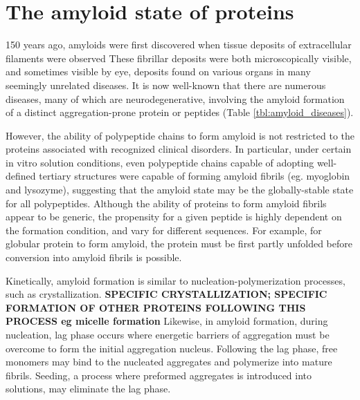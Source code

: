 
\section{The amyloid state of proteins}

150 years ago, amyloids were first discovered when tissue deposits of extracellular filaments were observed\cite{Haass:2007db,Sipe:2000fs} These fibrillar deposits were both microscopically visible, and sometimes visible by eye, deposits found on various organs in many seemingly unrelated diseases. It is now well-known that there are numerous diseases, many of which are neurodegenerative, involving the amyloid formation of a distinct aggregation-prone protein or peptides (Table \ref{tbl:amyloid_diseases}).

However, the ability of polypeptide chains to form amyloid is not restricted to the proteins associated with recognized clinical disorders. In particular, under certain in vitro solution conditions, even polypeptide chains capable of adopting well-defined tertiary structures were capable of forming amyloid fibrils (eg. myoglobin and lysozyme), suggesting that the amyloid state may be the globally-stable state for all polypeptides.  Although the ability of proteins to form amyloid fibrils appear to be generic, the propensity for a given peptide is highly dependent on the formation condition, and vary for different sequences. For example, for globular protein to form amyloid, the protein must be first partly unfolded before conversion into amyloid fibrils is possible.

Kinetically, amyloid formation is similar to nucleation-polymerization processes, such as crystallization. 
\textbf{SPECIFIC CRYSTALLIZATION; SPECIFIC FORMATION OF OTHER PROTEINS FOLLOWING THIS PROCESS eg micelle formation} Likewise, in amyloid formation, during nucleation, lag phase occurs where energetic barriers of aggregation must be overcome to form the initial aggregation nucleus. Following the lag phase, free monomers may bind to the nucleated aggregates and polymerize into mature fibrils.\cite{Murphy:2002fe} Seeding, a process where preformed aggregates is introduced into solutions, may eliminate the lag phase.\cite{harper and lansbury 1997, Jarrett and lansbury 1993}  

